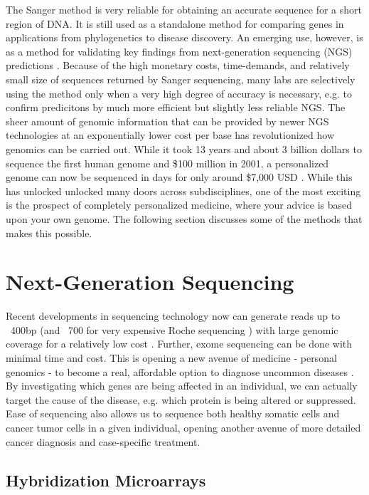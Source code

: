 \documentclass{easychithesis}
\begin{document}
The Sanger method is very reliable for obtaining an accurate sequence for a short region of DNA. It is still used as a standalone method for comparing genes in applications from phylogenetics to disease discovery. An emerging use, however, is as a method for validating key findings from next-generation sequencing (NGS) predictions \cite{ng2010exome, robison2010application}. Because of the high monetary costs, time-demands, and relatively small size of sequences returned by Sanger sequencing, many labs are selectively using the method only when a very high degree of accuracy is necessary, e.g. to confirm predicitons by much more efficient but slightly less reliable NGS. The sheer amount of genomic information that can be provided by newer NGS technologies at an exponentially lower cost per base has revolutionized how genomics can be carried out. While it took 13 years and about 3 billion dollars to sequence the first human genome and \$100 million in 2001, a personalized genome can now be sequenced in days for only around \$7,000 USD  \cite{history454, NIHnextgenhist}. While this has unlocked unlocked many doors across subdisciplines, one of the most exciting is the prospect of completely personalized medicine, where your advice is based upon your own genome. The following section discusses some of the methods that makes this possible.

\section{Next-Generation Sequencing}

Recent developments in sequencing technology now can generate reads up to ~400bp (and ~700 for very expensive Roche sequencing \cite{robison2010application}) with large genomic coverage for a relatively low cost \cite{barba2014historical}. Further, exome sequencing can be done with minimal time and cost. This is opening a new avenue of medicine - personal genomics - to become a real, affordable option to diagnose uncommon diseases \cite{pabinger2014survey, feuk2006structural}. By investigating which genes are being affected in an individual, we can actually target the cause of the disease, e.g. which protein is being altered or suppressed. Ease of sequencing also allows us to sequence both healthy somatic cells and cancer tumor cells in a given individual, opening another avenue of more detailed cancer diagnosis and case-specific treatment.

\subsection{Hybridization Microarrays}
\end{document}
